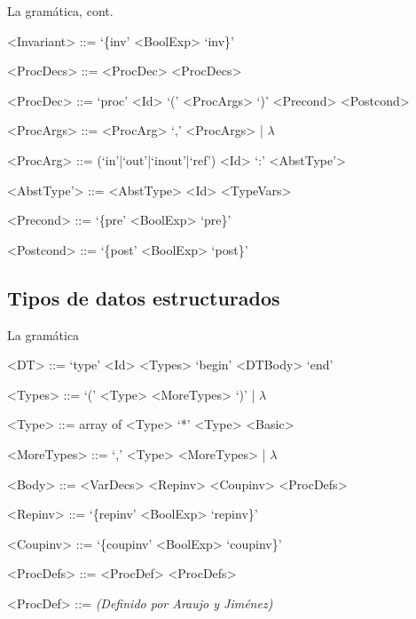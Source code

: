 \documentclass{beamer}
\begin{document}
\begin{frame}[fragile]{La gramática, cont.}
\scriptsize
\begin{grammar}

<Invariant> ::= `\{inv' <BoolExp> `inv\}'

<ProcDecs> ::= <ProcDec> <ProcDecs>

<ProcDec> ::= `proc' <Id> `(' <ProcArgs> `)' <Precond> <Postcond>

<ProcArgs> ::= <ProcArg> `,' <ProcArgs> | $\lambda$

<ProcArg> ::= (`in'|`out'|`inout'|`ref') <Id> `:' <AbstType'>

<AbstType'> ::= <AbstType>
\alt <Id> <TypeVars>

<Precond> ::= `\{pre' <BoolExp> `pre\}'

<Postcond> ::= `\{post' <BoolExp> `post\}'

\end{grammar}
\end{frame}


\subsection{Tipos de datos estructurados}
\begin{frame}[fragile]{La gramática}
\scriptsize
\begin{grammar}

<DT> ::= `type' <Id> <Types> `begin' <DTBody> `end'


<Types> ::= `(' <Type> <MoreTypes> `)' | $\lambda$

<Type> ::= array of <Type>
\alt `*' <Type>
\alt <Basic>

<MoreTypes> ::= `,' <Type> <MoreTypes> | $\lambda$

<Body> ::= <VarDecs> <Repinv> <Coupinv> <ProcDefs>

<Repinv> ::= `\{repinv' <BoolExp> `repinv\}'

<Coupinv> ::= `\{coupinv' <BoolExp> `coupinv\}'

<ProcDefs> ::= <ProcDef> <ProcDefs>

<ProcDef> ::= \textit{(Definido por Araujo y Jiménez)}

\end{grammar}
\end{frame}
\end{document}
